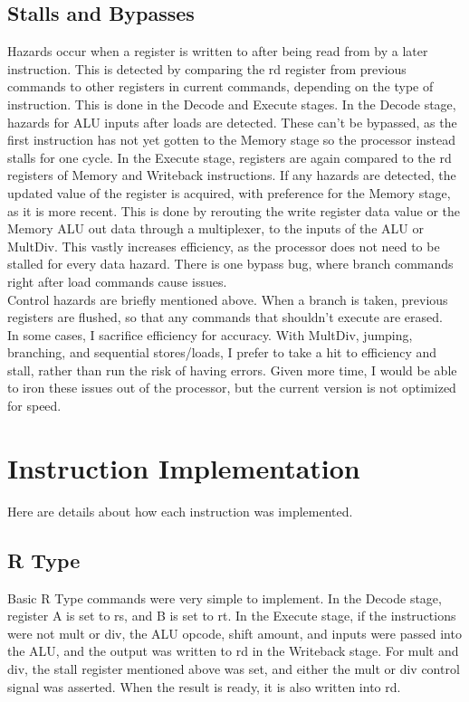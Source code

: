 \documentclass[letterpaper]{article} %
\begin{document}
\subsection*{Stalls and Bypasses}
Hazards occur when a register is written to after being read from by a later instruction. This is detected by comparing the rd register from previous commands to other registers in current commands, depending on the type of instruction. This is done in the Decode and Execute stages. In the Decode stage, hazards for ALU inputs after loads are detected. These can't be bypassed, as the first instruction has not yet gotten to the Memory stage so the processor instead stalls for one cycle. In the Execute stage, registers are again compared to the rd registers of Memory and Writeback instructions. If any hazards are detected, the updated value of the register is acquired, with preference for the Memory stage, as it is more recent. This is done by rerouting the write register data value or the Memory ALU out data through a multiplexer, to the inputs of the ALU or MultDiv. This vastly increases efficiency, as the processor does not need to be stalled for every data hazard. There is one bypass bug, where branch commands right after load commands cause issues.  \\
Control hazards are briefly mentioned above. When a branch is taken, previous registers are flushed, so that any commands that shouldn't execute are erased. \\
In some cases, I sacrifice efficiency for accuracy. With MultDiv, jumping, branching, and sequential stores/loads, I prefer to take a hit to efficiency and stall, rather than run the risk of having errors. Given more time, I would be able to iron these issues out of the processor, but the current version is not optimized for speed. \\


\section*{Instruction Implementation}
Here are details about how each instruction was implemented.
\subsection*{R Type}
Basic R Type commands were very simple to implement. In the Decode stage, register A is set to rs, and B is set to rt. In the Execute stage, if the instructions were not mult or div, the ALU opcode, shift amount, and inputs were passed into the ALU, and the output was written to rd in the Writeback stage. For mult and div, the stall register mentioned above was set, and either the mult or div control signal was asserted. When the result is ready, it is also written into rd.
\end{document}
